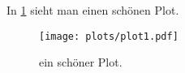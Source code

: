 \documentclass{scrartcl}
\begin{document}
In \ref{fig:plt1} sieht man einen schönen Plot.
\begin{figure}
  \centering
  \texttt{[image: plots/plot1.pdf]}
  \caption{ein schöner Plot.}
  \label{fig:plt1}
\end{figure}
\end{document}
